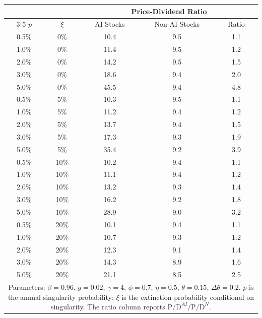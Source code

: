 \begin{tabular}{cc ccc}
\toprule
 & & \multicolumn{3}{c}{Price-Dividend Ratio} \\
\cmidrule(lr){3-5}
$p$ & $\xi$ & AI Stocks & Non-AI Stocks & Ratio \\
\midrule
0.5\% & 0\% & 10.4 & 9.5 & 1.1 \\
\midrule
1.0\% & 0\% & 11.4 & 9.5 & 1.2 \\
\midrule
2.0\% & 0\% & 14.2 & 9.5 & 1.5 \\
\midrule
3.0\% & 0\% & 18.6 & 9.4 & 2.0 \\
\midrule
5.0\% & 0\% & 45.5 & 9.4 & 4.8 \\
\midrule
0.5\% & 5\% & 10.3 & 9.5 & 1.1 \\
\midrule
1.0\% & 5\% & 11.2 & 9.4 & 1.2 \\
\midrule
2.0\% & 5\% & 13.7 & 9.4 & 1.5 \\
\midrule
3.0\% & 5\% & 17.3 & 9.3 & 1.9 \\
\midrule
5.0\% & 5\% & 35.4 & 9.2 & 3.9 \\
\midrule
0.5\% & 10\% & 10.2 & 9.4 & 1.1 \\
\midrule
1.0\% & 10\% & 11.1 & 9.4 & 1.2 \\
\midrule
2.0\% & 10\% & 13.2 & 9.3 & 1.4 \\
\midrule
3.0\% & 10\% & 16.2 & 9.2 & 1.8 \\
\midrule
5.0\% & 10\% & 28.9 & 9.0 & 3.2 \\
\midrule
0.5\% & 20\% & 10.1 & 9.4 & 1.1 \\
\midrule
1.0\% & 20\% & 10.7 & 9.3 & 1.2 \\
\midrule
2.0\% & 20\% & 12.3 & 9.1 & 1.4 \\
\midrule
3.0\% & 20\% & 14.3 & 8.9 & 1.6 \\
\midrule
5.0\% & 20\% & 21.1 & 8.5 & 2.5 \\
\bottomrule
\multicolumn{5}{p{0.85\textwidth}}{\footnotesize Parameters: $\beta=0.96$, $g=0.02$, $\gamma=4$, $\phi=0.7$, $\eta=0.5$, $\theta=0.15$, $\Delta\theta=0.2$. $p$ is the annual singularity probability; $\xi$ is the extinction probability conditional on singularity. The ratio column reports $\text{P/D}^{AI} / \text{P/D}^{N}$.} \\
\end{tabular}
